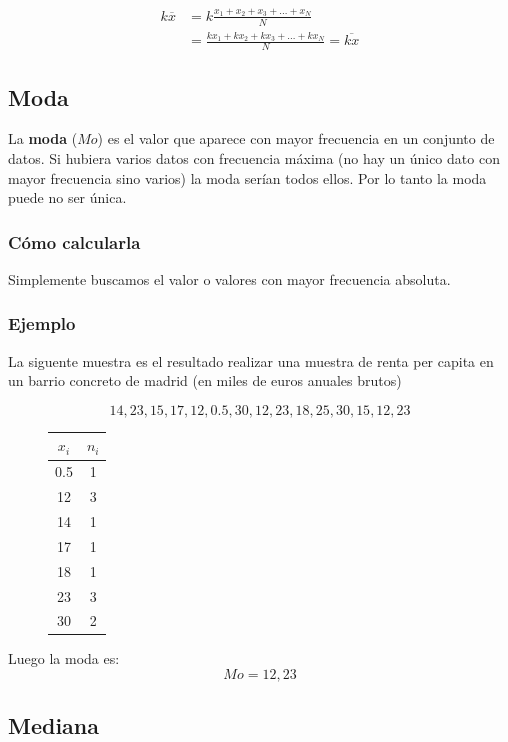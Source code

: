 \documentclass[]{article}
\theoremstyle{plain}
\theoremstyle{definition}
\theoremstyle{definition} %
\begin{document}
\begin{align*}
k \overline{x} &= k\frac{x_1+ x_2  + x_3  +\ldots  + x_N }{N}\\
&=\frac{k x_1+ k x_2 + k x_3  +\ldots  + k x_N}{N} = \overline {kx}
\end{align*}

\hypertarget{moda}{%
\subsection{Moda}\label{moda}}

La \textbf{moda} (\(Mo\)) es el valor que aparece con mayor frecuencia
en un conjunto de datos. Si hubiera varios datos con frecuencia máxima
(no hay un único dato con mayor frecuencia sino varios) la moda serían
todos ellos. Por lo tanto la moda puede no ser única.

\hypertarget{cuxf3mo-calcularla-1}{%
\subsubsection{Cómo calcularla}\label{cuxf3mo-calcularla-1}}

Simplemente buscamos el valor o valores con mayor frecuencia absoluta.

\hypertarget{ejemplo-2}{%
\subsubsection{Ejemplo}\label{ejemplo-2}}

La siguente muestra es el resultado realizar una muestra de renta per
capita en un barrio concreto de madrid (en miles de euros anuales
brutos)

\[ 14, 23, 15, 17,12, 0.5, 30, 12, 23, 18, 25, 30, 15, 12, 23 \]

\begin{figure}
  \centering
\begin{tabular}{cc}
\(x_i\) & \(n_i\)\tabularnewline
\hline
0.5 & 1\\
12 & 3 \\
14 & 1 \\
17 & 1 \\
18 & 1 \\
23 & 3 \\
30 & 2 \\
\end{tabular}
\end{figure}

Luego la moda es: \[Mo = 12, 23\]

\hypertarget{mediana}{%
\subsection{Mediana}\label{mediana}}
\end{document}
